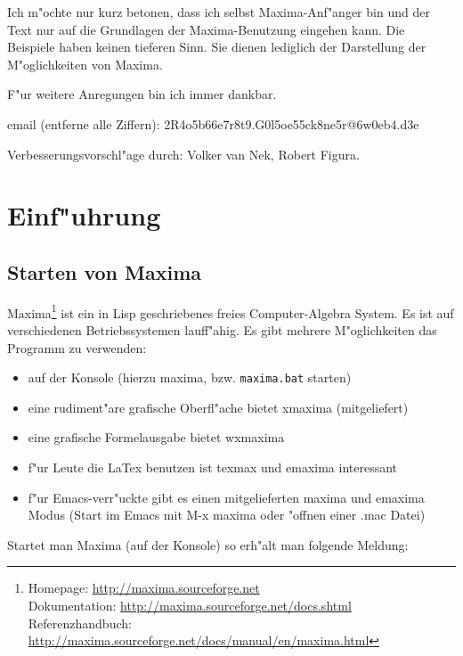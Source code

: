 \documentclass[ngerman,12pt,a4paper]{article}
\begin{document}
\vspace{1cm}

Ich m"ochte nur kurz betonen, dass ich selbst Maxima-Anf"anger bin und der Text nur auf die Grundlagen der Maxima-Benutzung eingehen kann. Die Beispiele haben keinen tieferen Sinn. Sie dienen lediglich der Darstellung der M"oglichkeiten von Maxima.

F"ur weitere Anregungen bin ich immer dankbar\@.

email (entferne alle Ziffern): 2R4o5b66e7r8t9.G0l5oe55ck8ne5r@6w0eb4.d3e

Verbesserungsvorschl"age durch: Volker van Nek, Robert Figura.

\newpage
\pagestyle{headings}

\section{Einf"uhrung}

\subsection{Starten von Maxima}

Maxima\footnote
{Homepage: \url{http://maxima.sourceforge.net} \\
Dokumentation: \url{http://maxima.sourceforge.net/docs.shtml} \\
Referenzhandbuch: \url{http://maxima.sourceforge.net/docs/manual/en/maxima.html}}
ist ein in Lisp geschriebenes freies Computer-Algebra System. Es ist
auf verschiedenen Betriebssystemen lauff"ahig.
Es gibt mehrere M"oglichkeiten das Programm zu verwenden:

\begin{itemize}
\item auf der Konsole (hierzu maxima, bzw. \verb|maxima.bat| starten)
\item eine rudiment"are grafische Oberfl"ache bietet xmaxima (mitgeliefert)
\item eine grafische Formelausgabe bietet wxmaxima
\item f"ur Leute die LaTex benutzen ist texmax und emaxima interessant
\item f"ur Emacs-verr"uckte gibt es einen mitgelieferten maxima und emaxima Modus (Start im Emacs mit M-x maxima oder "offnen einer {.mac} Datei)
\end{itemize}

Startet man Maxima (auf der Konsole) so erh"alt man folgende Meldung:
\end{document}
